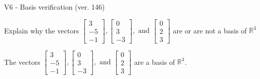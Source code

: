 \begin{exercise}
  \begin{exerciseTitle}V6 - Basis verification (ver. 146)\end{exerciseTitle}
  \begin{exerciseStatement}
    Explain why the vectors \(\left[\begin{array}{r}
3 \\
-5 \\
-1
\end{array}\right] , \left[\begin{array}{r}
0 \\
3 \\
-3
\end{array}\right] , \text{ and } \left[\begin{array}{r}
0 \\
2 \\
3
\end{array}\right]\) are or are not a basis of \(\mathbb{R}^3\)	


  \end{exerciseStatement}
  \begin{exerciseAnswer}
   The vectors \(\left[\begin{array}{r}
3 \\
-5 \\
-1
\end{array}\right] , \left[\begin{array}{r}
0 \\
3 \\
-3
\end{array}\right] , \text{ and } \left[\begin{array}{r}
0 \\
2 \\
3
\end{array}\right]\) 
  	 are  a basis of \(\mathbb{R}^3\).
  


  \end{exerciseAnswer}
\end{exercise}